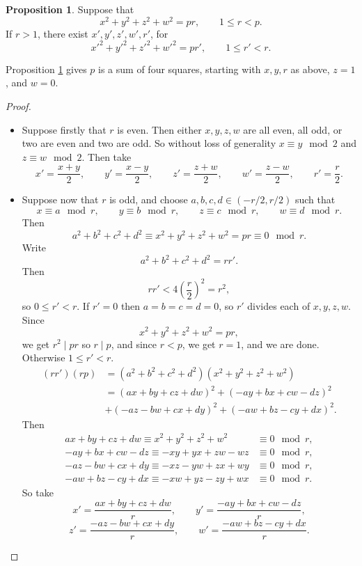 \documentclass{article}
\newcommand{\rb}[1]{\left( #1 \right)}
\theoremstyle{definition}\newtheorem{definition}{Definition}
\theoremstyle{definition}\newtheorem{remark}[definition]{Remark}
\theoremstyle{definition}\newtheorem*{example}{Example}
\theoremstyle{definition}\newtheorem*{note}{Note}
\newtheorem{proposition}[definition]{Proposition}
\begin{document}
\begin{proposition}
\label{prop:55}
Suppose that
$$ x^2 + y^2 + z^2 + w^2 = pr, \qquad 1 \le r < p. $$
If $ r > 1 $, there exist $ x', y', z', w', r' $, for
$$ x'^2 + y'^2 + z'^2 + w'^2 = pr', \qquad 1 \le r' < r. $$
\end{proposition}

Proposition \ref{prop:55} gives $ p $ is a sum of four squares, starting with $ x, y, r $ as above, $ z = 1 $, and $ w = 0 $.

\begin{proof}
\hfill
\begin{itemize}
\item Suppose firstly that $ r $ is even. Then either $ x, y, z, w $ are all even, all odd, or two are even and two are odd. So without loss of generality $ x \equiv y \mod 2 $ and $ z \equiv w \mod 2 $. Then take
$$ x' = \dfrac{x + y}{2}, \qquad y' = \dfrac{x - y}{2}, \qquad z' = \dfrac{z + w}{2}, \qquad w' = \dfrac{z - w}{2}, \qquad r' = \dfrac{r}{2}. $$
\item Suppose now that $ r $ is odd, and choose $ a, b, c, d \in \rb{-r / 2, r / 2} $ such that
$$ x \equiv a \mod r, \qquad y \equiv b \mod r, \qquad z \equiv c \mod r, \qquad w \equiv d \mod r. $$
Then
$$ a^2 + b^2 + c^2 + d^2 \equiv x^2 + y^2 + z^2 + w^2 = pr \equiv 0 \mod r. $$
Write
$$ a^2 + b^2 + c^2 + d^2 = rr'. $$
Then
$$ rr' < 4\rb{\dfrac{r}{2}}^2 = r^2, $$
so $ 0 \le r' < r $. If $ r' = 0 $ then $ a = b = c = d = 0 $, so $ r' $ divides each of $ x, y, z, w $. Since
$$ x^2 + y^2 + z^2 + w^2 = pr, $$
we get $ r^2 \mid pr $ so $ r \mid p $, and since $ r < p $, we get $ r = 1 $, and we are done. Otherwise $ 1 \le r' < r $.
\begin{align*}
\rb{rr'}\rb{rp}
& = \rb{a^2 + b^2 + c^2 + d^2}\rb{x^2 + y^2 + z^2 + w^2} \\
& = \rb{ax + by + cz + dw}^2 + \rb{-ay + bx + cw - dz}^2 \\
& + \rb{-az - bw + cx + dy}^2 + \rb{-aw + bz - cy + dx}^2.
\end{align*}
Then
\begin{align*}
ax + by + cz + dw \equiv x^2 + y^2 + z^2 + w^2 & \equiv 0 \mod r, \\
-ay + bx + cw - dz \equiv -xy + yx + zw - wz & \equiv 0 \mod r, \\
-az - bw + cx + dy \equiv -xz - yw + zx + wy & \equiv 0 \mod r, \\
-aw + bz - cy + dx \equiv -xw + yz - zy + wx & \equiv 0 \mod r.
\end{align*}
So take
$$ x' = \dfrac{ax + by + cz + dw}{r}, \qquad y' = \dfrac{-ay + bx + cw - dz}{r}, $$
$$ z' = \dfrac{-az - bw + cx + dy}{r}, \qquad w' = \dfrac{-aw + bz - cy + dx}{r}. $$
\end{itemize}
\end{proof}
\end{document}
